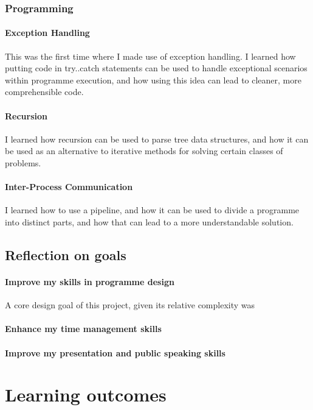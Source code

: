         \subsubsection{Programming}
            \paragraph{Exception Handling}
            This was the first time where I made use of exception handling. I learned how putting code in try..catch statements can be used to handle exceptional scenarios within programme execution, and how using this idea can lead to cleaner, more comprehensible code.
            \paragraph{Recursion}
            I learned how recursion can be used to parse tree data structures, and how it can be used as an alternative to iterative methods for solving certain classes of problems.
            \paragraph{Inter-Process Communication}
            I learned how to use a pipeline, and how it can be used to divide a programme into distinct parts, and how that can lead to a more understandable solution.
    \subsection{Reflection on goals}
        \paragraph{Improve my skills in programme design}
        A core design goal of this project, given its relative complexity was 
        \paragraph{Enhance my time management skills}
        \paragraph{Improve my presentation and public speaking skills}

\section{Learning outcomes}
    